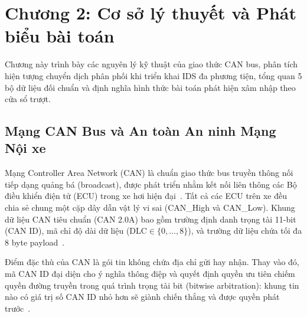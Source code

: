 \documentclass[12pt, a4paper, reqno, oneside]{book}
\begin{document}
\chapter{Chương 2: Cơ sở lý thuyết và Phát biểu bài toán}
\label{chap:background}

Chương này trình bày các nguyên lý kỹ thuật của giao thức CAN bus, phân tích hiện tượng chuyển dịch phân phối khi triển khai IDS đa phương tiện, tổng quan 5 bộ dữ liệu đối chuẩn và định nghĩa hình thức bài toán phát hiện xâm nhập theo cửa sổ trượt.

\section{Mạng CAN Bus và An toàn An ninh Mạng Nội xe}
\label{subsec:can_intrusion_detection}

Mạng Controller Area Network (CAN) là chuẩn giao thức bus truyền thông nối tiếp dạng quảng bá (broadcast), được phát triển nhằm kết nối liên thông các Bộ điều khiển điện tử (ECU) trong xe hơi hiện đại~\cite{song2020invehicle,lee2017otids,bozdal2020evaluation}. Tất cả các ECU trên xe đều chia sẻ chung một cặp dây dẫn vật lý vi sai (CAN\_High và CAN\_Low). Khung dữ liệu CAN tiêu chuẩn (CAN 2.0A) bao gồm trường định danh trọng tài 11-bit (CAN ID), mã chỉ độ dài dữ liệu ($\text{DLC} \in \{0, \dots, 8\}$), và trường dữ liệu chứa tối đa 8 byte payload~\cite{lampe2024curated}. 

Điểm đặc thù của CAN là gói tin không chứa địa chỉ gửi hay nhận. Thay vào đó, mã CAN ID đại diện cho ý nghĩa thông điệp và quyết định quyền ưu tiên chiếm quyền đường truyền trong quá trình trọng tài bit (bitwise arbitration): khung tin nào có giá trị số CAN ID nhỏ hơn sẽ giành chiến thắng và được quyền phát trước~\cite{song2020invehicle}. 
\end{document}
